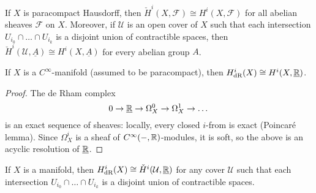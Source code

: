 \begin{prop}\label{prop:comparison-sheaf-cohomology-Čech-cohomology}
If \(X\) is paracompact Hausdorff, then \(\check{H}^i(X,\mathcal F)\cong H^i(X,\mathcal F)\) for all abelian sheaves \(\mathcal F\) on \(X\).
Moreover, if \(\mathcal U\) is an open cover of \(X\) such that each intersection \(U_{i_0}\cap\dots\cap U_{i_k}\) is a disjoint union of contractible spaces, then \(\check{H}^i(\mathcal U,\underline{A})\cong H^i(X,\underline{A})\) for every abelian group \(A\).
\end{prop}

\begin{prop}\label{prop:comparison-de-Rham-cohomology-sheaf-cohomology}
If \(X\) is a \(C^\infty\)-manifold (assumed to be paracompact), then \(H^i_{\smash{\textup{dR}}}(X)\cong H^i(X,\underline{\mathbb{R}})\).
\end{prop}
\begin{proof}
The de Rham complex
\[ 0\to\underline{\mathbb{R}}\to \Omega^0_X \to \Omega^1_X \to \dots \]
is an exact sequence of sheaves: locally, every closed \(i\)-from is exact (Poincaré lemma).
Since \(\Omega^i_X\) is a sheaf of \(C^\infty(-,\mathbb{R})\)-modules, it is soft, so the above is an acyclic resolution of \(\underline{\mathbb{R}}\).
\end{proof}

\begin{prop}\label{prop:comparison-de-Rham-cohomology-Čech-chomology}
If \(X\) is a manifold, then \(H^i_{\smash{\textup{dR}}}(X)\cong\check{H}^i(\mathcal U,\underline{\mathbb{R}})\) for any cover \(\mathcal U\) such that each intersection \(U_{i_0}\cap \dots\cap U_{i_k}\) is a disjoint union of contractible spaces.
\end{prop}


